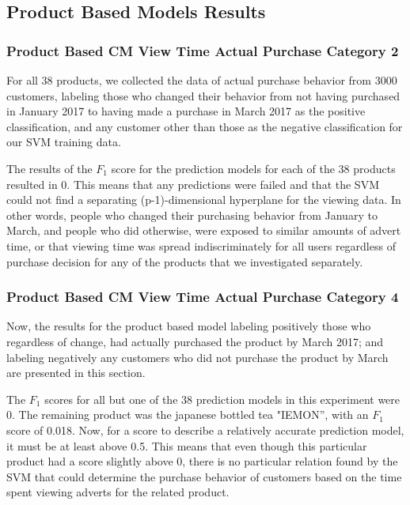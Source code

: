 \documentclass[review]{elsarticle}
\begin{document}
\subsection{Product Based Models Results}
\label{prod_base_results}

\subsubsection{Product Based CM View Time \textperiodcentered  Actual Purchase Category 2}
\label{prod_ap_2}

For all 38 products, we collected the data of actual purchase behavior from 3000 customers, labeling those who changed their behavior from not having purchased in January 2017 to having made a purchase in March 2017 as the positive classification, and any customer other than those as the negative classification for our SVM training data.

The results of the \(F_{1}\) score for the prediction models for each of the 38 products resulted in 0. This means that any predictions were failed and that the SVM could not find a separating (p-1)-dimensional hyperplane for the viewing data. In other words, people who changed their purchasing behavior from January to March, and people who did otherwise, were exposed to similar amounts of advert time, or that viewing time was spread indiscriminately for all users regardless of purchase decision for any of the products that we investigated separately. 

\subsubsection{Product Based CM View Time \textperiodcentered  Actual Purchase Category 4}
\label{prod_ap_4}

Now, the results for the product based model labeling positively those who regardless of change, had actually purchased the product by March 2017; and labeling negatively any customers who did not purchase the product by March are presented in this section.

The \(F_{1}\) scores for all but one of the 38 prediction models in this experiment were 0. The remaining product was the japanese bottled tea "IEMON”, with an \(F_{1}\) score of 0.018. Now, for a score to describe a relatively accurate prediction model, it must be at least above 0.5. This means that even though this particular product had a score slightly above 0, there is no particular relation found by the SVM that could determine the purchase behavior of customers based on the time spent viewing adverts for the related product.
\end{document}
